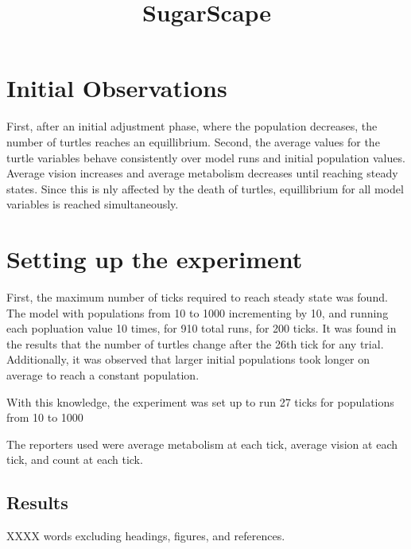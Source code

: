 \documentclass[11pt]{article} %
\title{\vspace{-3.0cm}SugarScape}
\begin{document}
\maketitle

\section{Initial Observations}

First, after an initial adjustment phase, where the population decreases, the number of turtles reaches an equillibrium. 
Second, the average values for the turtle variables behave consistently over model runs and initial population values. Average vision increases and average metabolism decreases until reaching steady states. Since this is nly affected by the death of turtles, equillibrium for all model variables is reached simultaneously. 

\section{Setting up the experiment}

First, the maximum number of ticks required to reach steady state was found. The model with populations from 10 to 1000 incrementing by 10, and running each popluation value 10 times, for 910 total runs, for 200 ticks. It was found in the results that the number of turtles change after the 26th tick for any trial. Additionally, it was observed that larger initial populations took longer on average to reach a constant population. 



With this knowledge, the experiment was set up to run 27 ticks for populations from 10 to 1000

The reporters used were average metabolism at each tick, average vision at each tick, and count at each tick. 


\subsection{Results}




XXXX words excluding headings, figures, and references. \\
\end{document}
